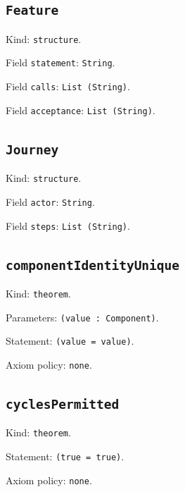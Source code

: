 \documentclass[11pt]{article}
\begin{document}
\subsection*{\texttt{Feature}}
\noindent Kind: \texttt{structure}.\par
\noindent Field \texttt{statement}: \texttt{String}.\par
\noindent Field \texttt{calls}: \texttt{List (String)}.\par
\noindent Field \texttt{acceptance}: \texttt{List (String)}.\par
\subsection*{\texttt{Journey}}
\noindent Kind: \texttt{structure}.\par
\noindent Field \texttt{actor}: \texttt{String}.\par
\noindent Field \texttt{steps}: \texttt{List (String)}.\par
\subsection*{\texttt{componentIdentityUnique}}
\noindent Kind: \texttt{theorem}.\par
\noindent Parameters: \texttt{(value : Component)}.\par
\noindent Statement: \texttt{(value = value)}.\par
\noindent Axiom policy: \texttt{none}.\par
\subsection*{\texttt{cyclesPermitted}}
\noindent Kind: \texttt{theorem}.\par
\noindent Statement: \texttt{(true = true)}.\par
\noindent Axiom policy: \texttt{none}.\par
\end{document}
